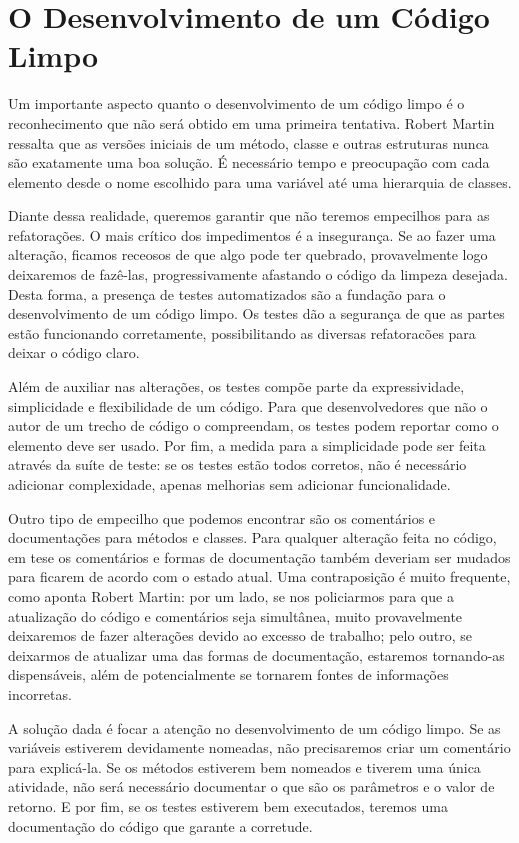 \section{O Desenvolvimento de um Código Limpo} 
Um importante aspecto quanto o desenvolvimento de um código limpo é o reconhecimento que não será obtido em uma primeira tentativa. Robert Martin ressalta que as versões iniciais de um método, classe e outras estruturas nunca são exatamente uma boa solução. É necessário tempo e preocupação com cada elemento desde o nome escolhido para uma variável até uma hierarquia de classes.

Diante dessa realidade, queremos garantir que não teremos empecilhos para as refatorações.
O mais crítico dos impedimentos é a insegurança. Se ao fazer uma alteração, ficamos receosos de que algo pode ter quebrado, provavelmente logo deixaremos de fazê-las, progressivamente afastando o código da limpeza desejada. Desta forma, a presença de testes automatizados são a fundação para o desenvolvimento de um código limpo. Os testes dão a segurança de que as partes estão funcionando corretamente, possibilitando as diversas refatoracões para deixar o código claro.

Além de auxiliar nas alterações, os testes compõe parte da expressividade, simplicidade e flexibilidade de um código. Para que desenvolvedores que não o autor de um trecho de código o compreendam, os testes podem reportar como o elemento deve ser usado. Por fim, a medida para a simplicidade pode ser feita através da suíte de teste: se os testes estão todos corretos, não é necessário adicionar complexidade, apenas melhorias sem adicionar funcionalidade. 

Outro tipo de empecilho que podemos encontrar são os comentários e documentações para métodos e classes. Para qualquer alteração feita no código, em tese os comentários e formas de documentação também deveriam ser mudados para ficarem de acordo com o estado atual. Uma contraposição é muito frequente, como aponta Robert Martin: por um lado, se nos policiarmos para que a atualização do código e comentários seja simultânea, muito provavelmente deixaremos de fazer alterações devido ao excesso de trabalho; pelo outro, se deixarmos de atualizar uma das formas de documentação, estaremos tornando-as dispensáveis, além de potencialmente se tornarem fontes de informações incorretas.

A solução dada é focar a atenção no desenvolvimento de um código limpo. Se as variáveis estiverem devidamente nomeadas, não precisaremos criar um comentário para explicá-la. Se os métodos estiverem bem nomeados e tiverem uma única atividade, não será necessário documentar o que são os parâmetros e o valor de retorno. E por fim, se os testes estiverem bem executados, teremos uma documentação do código que garante a corretude.

